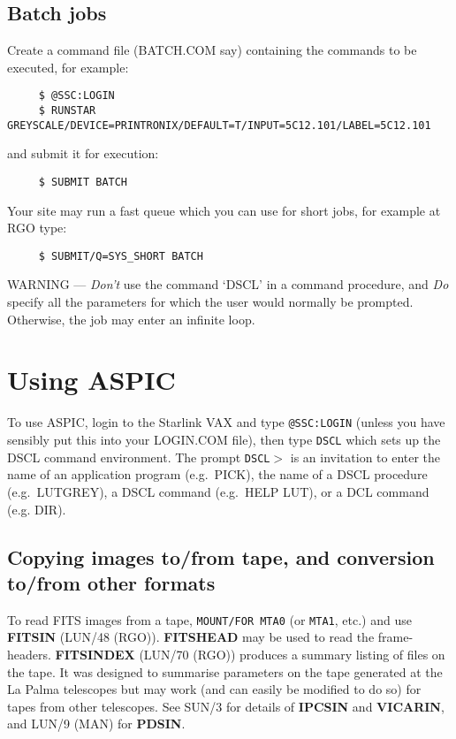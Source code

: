 \subsection{Batch jobs}

Create a command file (BATCH.COM say) containing the commands to be
executed, for example:
\begin{verbatim}
     $ @SSC:LOGIN
     $ RUNSTAR GREYSCALE/DEVICE=PRINTRONIX/DEFAULT=T/INPUT=5C12.101/LABEL=5C12.101
\end{verbatim}
and submit it for execution:
\begin{verbatim}
     $ SUBMIT BATCH
\end{verbatim}
Your site may run a fast queue which you can use for short jobs, for example
at RGO type:
\begin{verbatim}
     $ SUBMIT/Q=SYS_SHORT BATCH
\end{verbatim}
WARNING --- {\em Don't} use the command `DSCL' in a command procedure, and
{\em Do} specify all the parameters for which the user would normally be prompted.
Otherwise, the job may enter an infinite loop.

\section {Using ASPIC}

To use ASPIC, login to the Starlink VAX and type {\tt @SSC:LOGIN} (unless
you have sensibly put this into your LOGIN.COM file), then type
{\tt DSCL} which sets up the DSCL command environment.
The prompt {\tt DSCL$>$} is an invitation to enter the name of an
application program (e.g.\ PICK), the name of a DSCL procedure (e.g.\
LUTGREY), a DSCL command (e.g.\ HELP LUT), or a DCL command (e.g. DIR).

\subsection {Copying images to/from tape,
and conversion to/from other formats}

To read FITS images from a tape, {\tt MOUNT/FOR MTA0} (or {\tt MTA1}, etc.)
and use {\bf FITSIN} (LUN/48 (RGO)).
{\bf FITSHEAD} may be used to read the frame-headers.
{\bf FITSINDEX} (LUN/70 (RGO)) produces a summary listing of files on the tape.
It was designed to summarise parameters on the tape generated at the La Palma
telescopes but may work (and can easily be modified to do so) for tapes from
other telescopes.
See SUN/3 for details of {\bf IPCSIN} and {\bf VICARIN}, and LUN/9 (MAN)
for {\bf PDSIN}.

